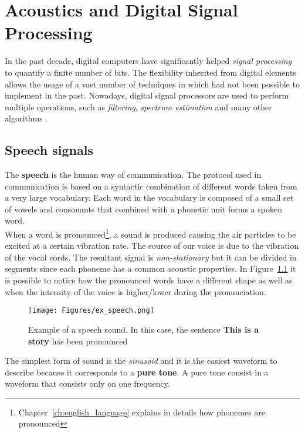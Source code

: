 
\chapter{Acoustics and Digital Signal Processing}
\label{ch:speech analysis}
In the past decade, digital computers have significantly helped \textit{signal processing} to quantify a finite number of bits. The flexibility inherited from digital elements allows the usage of a vast number of techniques in which had not been possible to implement in the past. Nowadays, digital signal processors are used to perform multiple operations, such as \textit{filtering}, \textit{spectrum estimation} and many other algorithms \cite{orfanidis1995introduction}.


\section{Speech signals}
\label{sec:speech_signals}
The \textbf{speech} is the human way of communication. The protocol used in communication is based on a syntactic combination of different words taken from a very large vocabulary. Each word in the vocabulary is composed of a small set of vowels and consonants that combined with a phonetic unit forms a spoken word. \\
\noindent When a word is pronounced\footnote{Chapter~\ref{ch:english_language} explains in details how phonemes are pronounced}, a sound is produced causing the air particles to be excited at a certain vibration rate. The source of our voice is due to the vibration of the vocal cords. The resultant signal is \textit{non-stationary} but it can be divided in segments since each phoneme has a common acoustic properties. In Figure~\ref{fig:ex_sound_wave} it is possible to notice how the pronounced words have a different shape as well as when the intensity of the voice is higher/lower during the pronunciation.

\begin{figure}[!ht]
	\centering
	\texttt{[image: Figures/ex\_speech.png]}
	\caption{Example of a speech sound. In this case, the sentence \textbf{This is a story} has been pronounced \cite{ex_speech_image}}
	\label{fig:ex_sound_wave}
\end{figure}

\noindent The simplest form of sound is the \textit{sinusoid} and it is the easiest waveform to describe because it corresponds to a \textbf{pure tone}. A pure tone consist in a waveform that consists only on one frequency.

